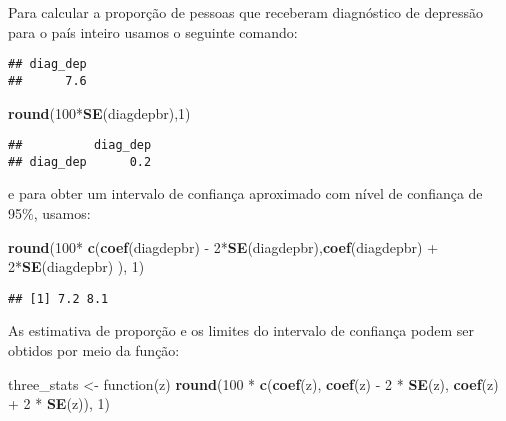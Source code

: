 \documentclass[]{book}
\newenvironment{Shaded}{\begin{snugshade}}{\end{snugshade}}
\newcommand{\KeywordTok}[1]{\textcolor[rgb]{0.13,0.29,0.53}{\textbf{{#1}}}}
\newcommand{\DecValTok}[1]{\textcolor[rgb]{0.00,0.00,0.81}{{#1}}}
\newcommand{\StringTok}[1]{\textcolor[rgb]{0.31,0.60,0.02}{{#1}}}
\newcommand{\CommentTok}[1]{\textcolor[rgb]{0.56,0.35,0.01}{\textit{{#1}}}}
\newcommand{\NormalTok}[1]{{#1}}
\theoremstyle{definition}
\theoremstyle{definition}
\theoremstyle{remark}
\begin{document}
Para calcular a proporção de pessoas que receberam diagnóstico de
depressão para o país inteiro usamos o seguinte comando:

\begin{Shaded}
\end{Shaded}

\begin{verbatim}
## diag_dep 
##      7.6
\end{verbatim}

\begin{Shaded}
\begin{Highlighting}[]
\KeywordTok{round}\NormalTok{(}\DecValTok{100}\NormalTok{*}\KeywordTok{SE}\NormalTok{(diagdepbr),}\DecValTok{1}\NormalTok{)}
\end{Highlighting}
\end{Shaded}

\begin{verbatim}
##          diag_dep
## diag_dep      0.2
\end{verbatim}

e para obter um intervalo de confiança aproximado com nível de confiança
de 95\%, usamos:

\begin{Shaded}
\begin{Highlighting}[]
\KeywordTok{round}\NormalTok{(}\DecValTok{100}\NormalTok{*}\StringTok{ }\KeywordTok{c}\NormalTok{(}\KeywordTok{coef}\NormalTok{(diagdepbr) -}\StringTok{ }\DecValTok{2}\NormalTok{*}\KeywordTok{SE}\NormalTok{(diagdepbr),}\KeywordTok{coef}\NormalTok{(diagdepbr) +}\StringTok{ }\DecValTok{2}\NormalTok{*}\KeywordTok{SE}\NormalTok{(diagdepbr)  ), }\DecValTok{1}\NormalTok{)}
\end{Highlighting}
\end{Shaded}

\begin{verbatim}
## [1] 7.2 8.1
\end{verbatim}

As estimativa de proporção e os limites do intervalo de confiança podem
ser obtidos por meio da função:

\begin{Shaded}
\begin{Highlighting}[]
\NormalTok{three_stats <-}\StringTok{ }\NormalTok{function(z) }\KeywordTok{round}\NormalTok{(}\DecValTok{100} \NormalTok{*}\StringTok{ }\KeywordTok{c}\NormalTok{(}\KeywordTok{coef}\NormalTok{(z), }\KeywordTok{coef}\NormalTok{(z) -}\StringTok{ }
\StringTok{  }\DecValTok{2} \NormalTok{*}\StringTok{ }\KeywordTok{SE}\NormalTok{(z), }\KeywordTok{coef}\NormalTok{(z) +}\StringTok{ }\DecValTok{2} \NormalTok{*}\StringTok{ }\KeywordTok{SE}\NormalTok{(z)), }\DecValTok{1}\NormalTok{)}
\end{Highlighting}
\end{Shaded}
\end{document}
